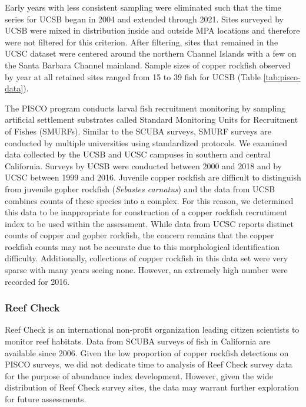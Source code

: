 \documentclass[11pt,
  english,
  letterpaper,
]{article}
\begin{document}
Early years with less consistent sampling were eliminated such that the time series for UCSB began in 2004 and extended through 2021. Sites surveyed by UCSB were mixed in distribution inside and outside MPA locations and therefore were not filtered for this criterion. After filtering, sites that remained in the UCSC dataset were centered around the northern Channel Islands with a few on the Santa Barbara Channel mainland. Sample sizes of copper rockfish observed by year at all retained sites ranged from 15 to 39 fish for UCSB (Table \ref{tab:pisco-data}).

The PISCO program conducts larval fish recruitment monitoring by sampling artificial settlement substrates called Standard Monitoring Units for Recruitment of Fishes (SMURFs). Similar to the SCUBA surveys, SMURF surveys are conducted by multiple universities using standardized protocols. We examined data collected by the UCSB and UCSC campuses in southern and central California. Surveys by UCSB were conducted between 2000 and 2018 and by UCSC between 1999 and 2016. Juvenile copper rockfish are difficult to distinguish from juvenile gopher rockfish (\emph{Sebastes carnatus}) and the data from UCSB combines counts of these species into a complex. For this reason, we determined this data to be inappropriate for construction of a copper rockfish recrutiment index to be used within the assessment. While data from UCSC reports distinct counts of copper and gopher rockfish, the concern remains that the copper rockfish counts may not be accurate due to this morphological identification difficulty. Additionally, collections of copper rockfish in this data set were very sparse with many years seeing none. However, an extremely high number were recorded for 2016.

\hypertarget{reef-check}{%
\subsubsection{Reef Check}\label{reef-check}}

Reef Check is an international non-profit organization leading citizen scientists to monitor reef habitats. Data from SCUBA surveys of fish in California are available since 2006. Given the low proportion of copper rockfish detections on PISCO surveys, we did not dedicate time to analysis of Reef Check survey data for the purpose of abundance index development. However, given the wide distribution of Reef Check survey sites, the data may warrant further exploration for future assessments.
\end{document}
